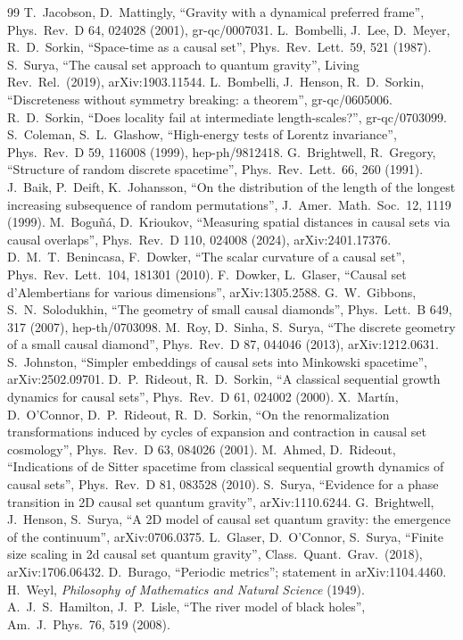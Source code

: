 \documentclass[11pt,a4paper]{article}
\begin{document}
\begin{thebibliography}{99}\small
{} T.~Jacobson, D.~Mattingly, ``Gravity with a dynamical preferred frame'', Phys.\ Rev.\ D 64, 024028 (2001), gr-qc/0007031.
 L.~Bombelli, J.~Lee, D.~Meyer, R.~D.~Sorkin, ``Space-time as a causal set'', Phys.\ Rev.\ Lett.\ 59, 521 (1987).
 S.~Surya, ``The causal set approach to quantum gravity'', Living Rev.\ Rel.\ (2019), arXiv:1903.11544.
 L.~Bombelli, J.~Henson, R.~D.~Sorkin, ``Discreteness without symmetry breaking: a theorem'', gr-qc/0605006.
 R.~D.~Sorkin, ``Does locality fail at intermediate length-scales?'', gr-qc/0703099.
 S.~Coleman, S.~L.~Glashow, ``High-energy tests of Lorentz invariance'', Phys.\ Rev.\ D 59, 116008 (1999), hep-ph/9812418.
 G.~Brightwell, R.~Gregory, ``Structure of random discrete spacetime'', Phys.\ Rev.\ Lett.\ 66, 260 (1991).
 J.~Baik, P.~Deift, K.~Johansson, ``On the distribution of the length of the longest increasing subsequence of random permutations'', J.\ Amer.\ Math.\ Soc.\ 12, 1119 (1999).
 M.~Boguñá, D.~Krioukov, ``Measuring spatial distances in causal sets via causal overlaps'', Phys.\ Rev.\ D 110, 024008 (2024), arXiv:2401.17376.
 D.~M.~T.~Benincasa, F.~Dowker, ``The scalar curvature of a causal set'', Phys.\ Rev.\ Lett.\ 104, 181301 (2010).
 F.~Dowker, L.~Glaser, ``Causal set d'Alembertians for various dimensions'', arXiv:1305.2588.
 G.~W.~Gibbons, S.~N.~Solodukhin, ``The geometry of small causal diamonds'', Phys.\ Lett.\ B 649, 317 (2007), hep-th/0703098.
 M.~Roy, D.~Sinha, S.~Surya, ``The discrete geometry of a small causal diamond'', Phys.\ Rev.\ D 87, 044046 (2013), arXiv:1212.0631.
 S.~Johnston, ``Simpler embeddings of causal sets into Minkowski spacetime'', arXiv:2502.09701.
 D.~P.~Rideout, R.~D.~Sorkin, ``A classical sequential growth dynamics for causal sets'', Phys.\ Rev.\ D 61, 024002 (2000).
 X.~Mart\'in, D.~O'Connor, D.~P.~Rideout, R.~D.~Sorkin, ``On the renormalization transformations induced by cycles of expansion and contraction in causal set cosmology'', Phys.\ Rev.\ D 63, 084026 (2001).
 M.~Ahmed, D.~Rideout, ``Indications of de Sitter spacetime from classical sequential growth dynamics of causal sets'', Phys.\ Rev.\ D 81, 083528 (2010).
 S.~Surya, ``Evidence for a phase transition in 2D causal set quantum gravity'', arXiv:1110.6244.
 G.~Brightwell, J.~Henson, S.~Surya, ``A 2D model of causal set quantum gravity: the emergence of the continuum'', arXiv:0706.0375.
 L.~Glaser, D.~O'Connor, S.~Surya, ``Finite size scaling in 2d causal set quantum gravity'', Class.\ Quant.\ Grav.\ (2018), arXiv:1706.06432.
 D.~Burago, ``Periodic metrics''; statement in arXiv:1104.4460.
 H.~Weyl, \emph{Philosophy of Mathematics and Natural Science} (1949).
 A.~J.~S.~Hamilton, J.~P.~Lisle, ``The river model of black holes'', Am.\ J.\ Phys.\ 76, 519 (2008).
\end{thebibliography}
\end{document}
